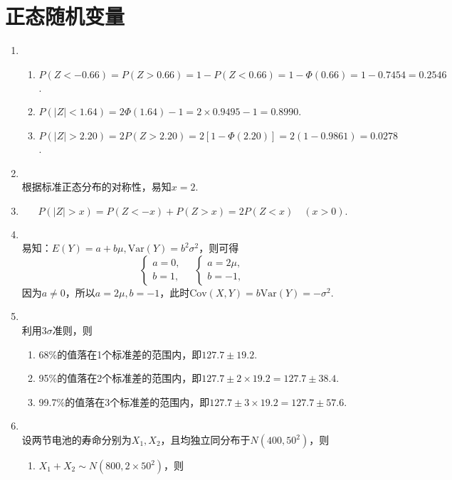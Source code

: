 \section{正态随机变量}
\begin{enumerate}[label=\arabic{section}.\arabic*]
    \item \sol
    \begin{enumerate}[label=\alph*)]
        \item $P(Z < -0.66) = P(Z > 0.66) = 1 - P(Z < 0.66) = 1 - \Phi(0.66) = 1 - 0.7454 = 0.2546$.
        \item $P(|Z| < 1.64) = 2\Phi(1.64)-1=2 \times 0.9495 -1 = 0.8990$.
        \item $P(|Z| > 2.20) = 2P(Z > 2.20)=2[1-\Phi(2.20)]=2(1 - 0.9861) = 0.0278$.
    \end{enumerate}
    \item \sol\\
    根据标准正态分布的对称性，易知$x=2$.
    \item \pro
    \[P(|Z|>x)=P(Z<-x)+P(Z>x)=2P(Z<x)\quad (x>0).\]
    \item \sol\\
    易知：$E(Y)=a+b\mu,\mathrm{Var}(Y)=b^2\sigma^2$，则可得
    \[\begin{cases}
        a=0,\\b=1,
    \end{cases}\quad\begin{cases}
        a=2\mu,\\b=-1,
    \end{cases}\]
    因为$a \neq 0$，所以$a=2\mu,b=-1$，此时$\mathrm{Cov}(X,Y)=b\mathrm{Var}(Y)=-\sigma^2$.
    \item \sol\\
    利用$3\sigma$准则，则
    \begin{enumerate}[label=\alph*)]
        \item 68\%的值落在1个标准差的范围内，即$127.7 \pm 19.2$.
        \item 95\%的值落在2个标准差的范围内，即$127.7 \pm 2\times19.2=127.7 \pm 38.4$.
        \item 99.7\%的值落在3个标准差的范围内，即$127.7 \pm 3\times19.2=127.7 \pm 57.6$.
    \end{enumerate}
    \item \sol\\
    设两节电池的寿命分别为$X_1,X_2$，且均独立同分布于$N(400,50^2)$，则
    \begin{enumerate}[label=\alph*)]
        \item $X_1+X_2 \sim N(800, 2\times50^2)$，则

\end{enumerate}
\end{enumerate}
